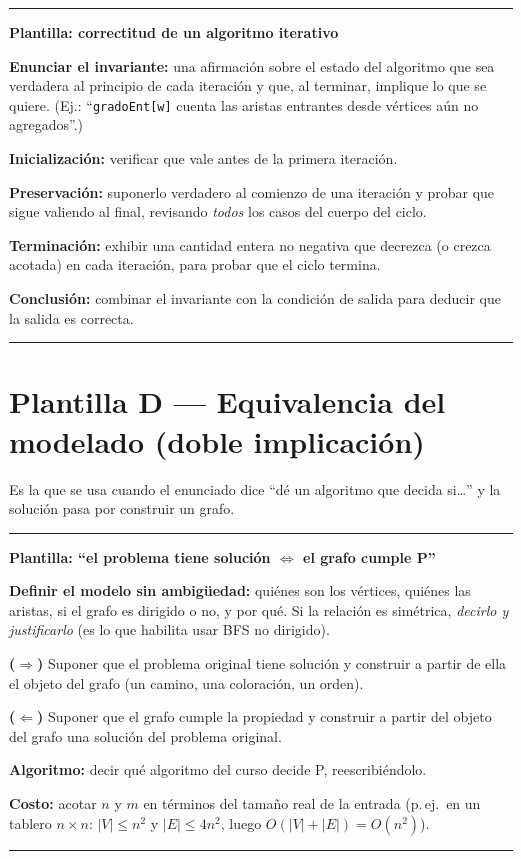 \documentclass[11pt,a4paper]{article}
\theoremstyle{plain}
\theoremstyle{definition}
\theoremstyle{remark}
\newenvironment{plantilla}[1]{\par\medskip\noindent
  \begin{minipage}{\textwidth}\hrule\vspace{3pt}
  \noindent\textbf{Plantilla: #1}\par\smallskip}
  {\vspace{2pt}\hrule\end{minipage}\par\medskip}
\begin{document}
\begin{plantilla}{correctitud de un algoritmo iterativo}
\begin{pasos}
\item \textbf{Enunciar el invariante:} una afirmación sobre el estado del algoritmo que
sea verdadera al principio de cada iteración y que, al terminar, implique lo que se
quiere. (Ej.: ``\texttt{gradoEnt[w]} cuenta las aristas entrantes desde vértices aún no
agregados''.)
\item \textbf{Inicialización:} verificar que vale antes de la primera iteración.
\item \textbf{Preservación:} suponerlo verdadero al comienzo de una iteración y probar
que sigue valiendo al final, revisando \emph{todos} los casos del cuerpo del ciclo.
\item \textbf{Terminación:} exhibir una cantidad entera no negativa que decrezca (o
crezca acotada) en cada iteración, para probar que el ciclo termina.
\item \textbf{Conclusión:} combinar el invariante con la condición de salida para
deducir que la salida es correcta.
\end{pasos}
\end{plantilla}

\section{Plantilla D --- Equivalencia del modelado (doble implicación)}

Es la que se usa cuando el enunciado dice ``dé un algoritmo que decida si\dots'' y la
solución pasa por construir un grafo.

\begin{plantilla}{``el problema tiene solución $\iff$ el grafo cumple P''}
\begin{pasos}
\item \textbf{Definir el modelo sin ambigüedad:} quiénes son los vértices, quiénes las
aristas, si el grafo es dirigido o no, y por qué. Si la relación es simétrica,
\emph{decirlo y justificarlo} (es lo que habilita usar BFS no dirigido).
\item \textbf{($\Rightarrow$)} Suponer que el problema original tiene solución y
construir a partir de ella el objeto del grafo (un camino, una coloración, un orden).
\item \textbf{($\Leftarrow$)} Suponer que el grafo cumple la propiedad y construir a
partir del objeto del grafo una solución del problema original.
\item \textbf{Algoritmo:} decir qué algoritmo del curso decide P, reescribiéndolo.
\item \textbf{Costo:} acotar $n$ y $m$ en términos del tamaño real de la entrada
(p.\,ej.\ en un tablero $n\times n$: $|V|\le n^2$ y $|E|\le 4n^2$, luego
$O(|V|+|E|)=O(n^2)$).
\end{pasos}
\end{plantilla}
\end{document}
